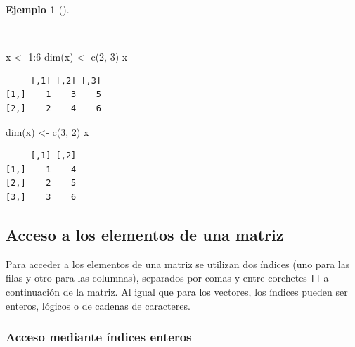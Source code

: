 \documentclass[
  spanish,
  a4paper,
]{scrreport}
\newenvironment{Shaded}{\begin{snugshade}}{\end{snugshade}}
\newcommand{\DecValTok}[1]{\textcolor[rgb]{0.68,0.00,0.00}{#1}}
\newcommand{\FunctionTok}[1]{\textcolor[rgb]{0.28,0.35,0.67}{#1}}
\newcommand{\NormalTok}[1]{\textcolor[rgb]{0.00,0.23,0.31}{#1}}
\newcommand{\OtherTok}[1]{\textcolor[rgb]{0.00,0.23,0.31}{#1}}
\newcommand{\SpecialCharTok}[1]{\textcolor[rgb]{0.37,0.37,0.37}{#1}}
\theoremstyle{definition}
\theoremstyle{definition}
\newtheorem{example}{Ejemplo}[chapter]
\theoremstyle{remark}
\begin{document}
\begin{example}[]\protect\hypertarget{exm-modificacion-dimensiones-matriz}{}\label{exm-modificacion-dimensiones-matriz}

~

\begin{Shaded}
\begin{Highlighting}[]
\NormalTok{x }\OtherTok{\textless{}{-}} \DecValTok{1}\SpecialCharTok{:}\DecValTok{6}
\FunctionTok{dim}\NormalTok{(x) }\OtherTok{\textless{}{-}} \FunctionTok{c}\NormalTok{(}\DecValTok{2}\NormalTok{, }\DecValTok{3}\NormalTok{)}
\NormalTok{x}
\end{Highlighting}
\end{Shaded}

\begin{verbatim}
     [,1] [,2] [,3]
[1,]    1    3    5
[2,]    2    4    6
\end{verbatim}

\begin{Shaded}
\begin{Highlighting}[]
\FunctionTok{dim}\NormalTok{(x) }\OtherTok{\textless{}{-}} \FunctionTok{c}\NormalTok{(}\DecValTok{3}\NormalTok{, }\DecValTok{2}\NormalTok{)}
\NormalTok{x}
\end{Highlighting}
\end{Shaded}

\begin{verbatim}
     [,1] [,2]
[1,]    1    4
[2,]    2    5
[3,]    3    6
\end{verbatim}

\end{example}

\subsection{Acceso a los elementos de una
matriz}\label{acceso-a-los-elementos-de-una-matriz}

Para acceder a los elementos de una matriz se utilizan dos índices (uno
para las filas y otro para las columnas), separados por comas y entre
corchetes \texttt{{[}{]}} a continuación de la matriz. Al igual que para
los vectores, los índices pueden ser enteros, lógicos o de cadenas de
caracteres.

\subsubsection{Acceso mediante índices
enteros}\label{acceso-mediante-uxedndices-enteros}
\end{document}
